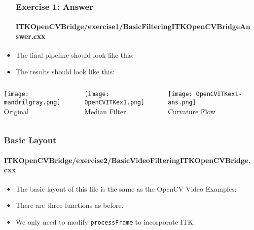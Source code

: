 \begin{frame}
\begin{itemize}
\frametitle{Exercise 1: Answer}
\framesubtitle{ITKOpenCVBridge/exercise1/BasicFilteringITKOpenCVBridgeAnswer.cxx}
\item The final pipeline should look like this:
\end{itemize}
\end{frame}

\begin{frame}
\begin{itemize}
\frametitle{Exercise 1: Answer}
\framesubtitle{ITKOpenCVBridge/exercise1/BasicFilteringITKOpenCVBridgeAnswer.cxx}
\item The results should look like this:
\end{itemize}
\begin{columns}[c]
\begin{center}
\texttt{[image: mandrilgray.png]} \\
Original
\end{center}
\begin{center}
\texttt{[image: OpenCVITKex1.png]} \\
Median Filter
\end{center}
\begin{center}
\texttt{[image: OpenCVITKex1-ans.png]} \\
Curvature Flow
\end{center}
\end{columns}
\end{frame}


\begin{frame}
\frametitle{Basic Layout}
\framesubtitle{ITKOpenCVBridge/exercise2/BasicVideoFilteringITKOpenCVBridge.cxx}
\begin{itemize}
\item The basic layout of this file is the same as the OpenCV Video
  Examples:
\item There are three functions as before.
\pause
\item We only need to modify {\tt processFrame} to incorporate ITK.
\end{itemize}
\end{frame}

